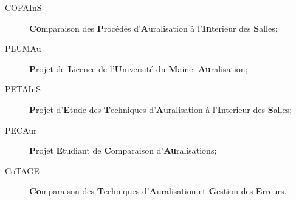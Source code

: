 \documentclass[a4paper, 11pt]{article}
\begin{document}
\begin{description}
\item[COPAInS] \textbf{Co}mparaison des \textbf{P}rocédés d'\textbf{A}uralisation à l'\textbf{In}terieur des \textbf{S}alles;
\item[PLUMAu] \textbf{P}rojet de \textbf{L}icence de l'\textbf{U}niversité du \textbf{M}aine: \textbf{Au}ralisation;
\item[PETAInS] \textbf{P}rojet d'\textbf{E}tude des \textbf{T}echniques d'\textbf{A}uralisation à l'\textbf{I}nterieur  des \textbf{S}alles;
\item[PECAur] \textbf{P}rojet \textbf{E}tudiant de \textbf{C}omparaison d'\textbf{Au}ralisations;
\item[CoTAGE] \textbf{Co}mparaison des \textbf{T}echniques d'\textbf{A}uralisation et \textbf{G}estion des \textbf{E}rreurs.
\end{description}
\end{document}
